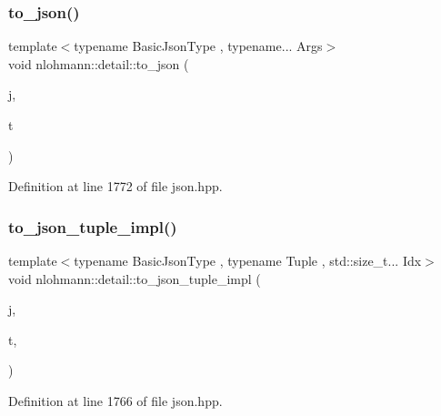 \mbox{\label{namespacenlohmann_1_1detail_aa7a47b08eee864c2c108c04954919648}} 
\subsubsection{\texorpdfstring{to\+\_\+json()}{to\_json()}\hspace{0.1cm}{\footnotesize\ttfamily [16/16]}}
{\footnotesize\ttfamily template$<$typename Basic\+Json\+Type , typename... Args$>$ \\
void nlohmann\+::detail\+::to\+\_\+json (\begin{DoxyParamCaption}\item[{Basic\+Json\+Type \&}]{j,  }\item[{const std\+::tuple$<$ Args... $>$ \&}]{t }\end{DoxyParamCaption})}



Definition at line 1772 of file json.\+hpp.

\mbox{\label{namespacenlohmann_1_1detail_a510dfa15b01e9a8afe31600a27b28199}} 
\subsubsection{\texorpdfstring{to\+\_\+json\+\_\+tuple\+\_\+impl()}{to\_json\_tuple\_impl()}}
{\footnotesize\ttfamily template$<$typename Basic\+Json\+Type , typename Tuple , std\+::size\+\_\+t... Idx$>$ \\
void nlohmann\+::detail\+::to\+\_\+json\+\_\+tuple\+\_\+impl (\begin{DoxyParamCaption}\item[{Basic\+Json\+Type \&}]{j,  }\item[{const Tuple \&}]{t,  }\item[{\hyperlink{structnlohmann_1_1detail_1_1index__sequence}{index\+\_\+sequence}$<$ Idx... $>$}]{ }\end{DoxyParamCaption})}



Definition at line 1766 of file json.\+hpp.

